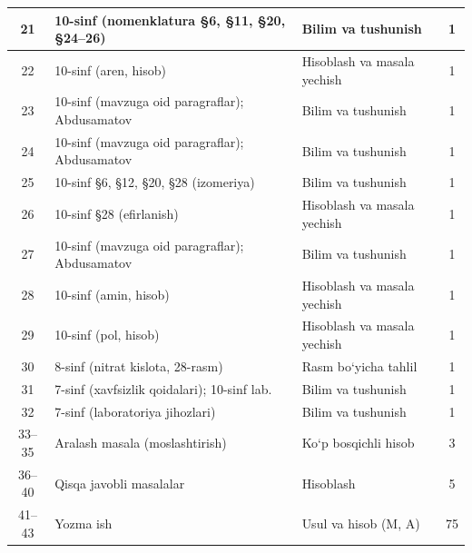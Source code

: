 \documentclass[11pt,a4paper]{article}
\begin{document}
{\begin{longtable}{|c|p{7.2cm}|p{5.4cm}|c|}
21 & 10-sinf (nomenklatura \S{}6, \S{}11, \S{}20, \S{}24--26) & Bilim va tushunish & 1\\\hline
22 & 10-sinf (aren, hisob) & Hisoblash va masala yechish & 1\\\hline
23 & 10-sinf (mavzuga oid paragraflar); Abdusamatov & Bilim va tushunish & 1\\\hline
24 & 10-sinf (mavzuga oid paragraflar); Abdusamatov & Bilim va tushunish & 1\\\hline
25 & 10-sinf \S{}6, \S{}12, \S{}20, \S{}28 (izomeriya) & Bilim va tushunish & 1\\\hline
26 & 10-sinf \S{}28 (efirlanish) & Hisoblash va masala yechish & 1\\\hline
27 & 10-sinf (mavzuga oid paragraflar); Abdusamatov & Bilim va tushunish & 1\\\hline
28 & 10-sinf (amin, hisob) & Hisoblash va masala yechish & 1\\\hline
29 & 10-sinf (pol, hisob) & Hisoblash va masala yechish & 1\\\hline
30 & 8-sinf (nitrat kislota, 28-rasm) & Rasm bo`yicha tahlil & 1\\\hline
31 & 7-sinf (xavfsizlik qoidalari); 10-sinf lab. & Bilim va tushunish & 1\\\hline
32 & 7-sinf (laboratoriya jihozlari) & Bilim va tushunish & 1\\\hline
33--35 & Aralash masala (moslashtirish) & Ko`p bosqichli hisob & 3\\\hline
36--40 & Qisqa javobli masalalar & Hisoblash & 5\\\hline
41--43 & Yozma ish & Usul va hisob (M, A) & 75\\\hline
\end{longtable}}
\end{document}
